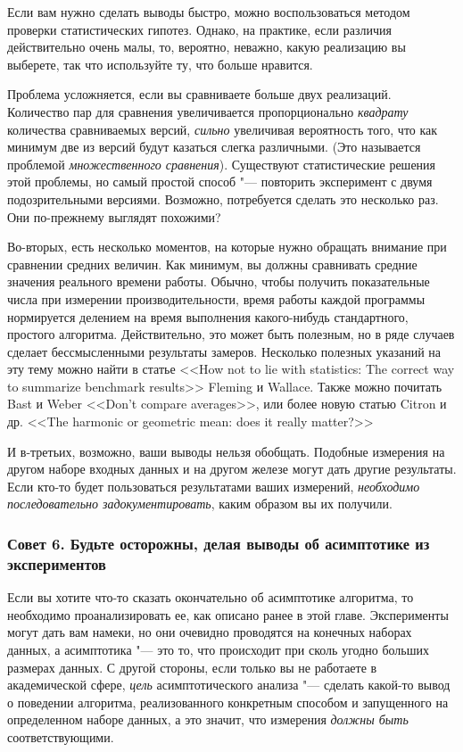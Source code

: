 \begin{note}
Если вам нужно сделать выводы быстро, можно воспользоваться методом проверки статистических гипотез. Однако, на практике, если различия действительно очень малы, то, вероятно, неважно, какую реализацию вы выберете, так что используйте ту, что больше нравится.
\end{note}

Проблема усложняется, если вы сравниваете больше двух реализаций. Количество пар для сравнения увеличивается пропорционально \textit{квадрату} количества сравниваемых версий, \textit{сильно} увеличивая вероятность того, что как минимум две из версий будут казаться слегка различными. (Это называется проблемой \textit{множественного сравнения}). Существуют статистические решения этой проблемы, но самый простой способ "--- повторить эксперимент с двумя подозрительными версиями. Возможно, потребуется сделать это несколько раз. Они по-прежнему выглядят похожими?

Во-вторых, есть несколько моментов, на которые нужно обращать внимание при сравнении средних величин. Как минимум, вы должны сравнивать средние значения реального времени работы. Обычно, чтобы получить показательные числа при измерении производительности, время работы каждой программы нормируется делением на время выполнения какого-нибудь стандартного, простого алгоритма. Действительно, это может быть полезным, но в ряде случаев сделает бессмысленными результаты замеров. Несколько полезных указаний на эту тему можно найти в статье <<How not to lie with statistics: The correct way to summarize benchmark results>> Fleming и Wallace. Также можно почитать Bast и Weber <<Don't compare averages>>, или более новую статью Citron и др. <<The harmonic or geometric mean: does it really matter?>>

И в-третьих, возможно, ваши выводы нельзя обобщать. Подобные измерения на другом наборе входных данных и на другом железе могут дать другие результаты. Если кто-то будет пользоваться результатами ваших измерений, \textit{необходимо последовательно задокументировать}, каким образом вы их получили.

\subsubsection*{Совет 6. Будьте осторожны, делая выводы об асимптотике из экспериментов}

Если вы хотите что-то сказать окончательно об асимптотике алгоритма, то необходимо проанализировать ее, как описано ранее в этой главе. Эксперименты могут дать вам намеки, но они очевидно проводятся на конечных наборах данных, а асимптотика "--- это то, что происходит при сколь угодно больших размерах данных. С другой стороны, если только вы не работаете в академической сфере, \textit{цель} асимптотического анализа "--- сделать какой-то вывод о поведении алгоритма, реализованного конкретным способом и запущенного на определенном наборе данных, а это значит, что измерения \textit{должны быть} соответствующими.


